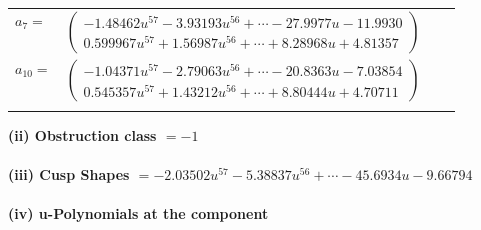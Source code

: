 \documentclass[1p]{elsarticle_modified}
\theoremstyle{definition}
\begin{document}
\begin{tabular}{m{7pt} m{180pt} m{7pt} m{180pt} }
\flushright $a_{7}=$&$\begin{pmatrix}-1.48462 u^{57}-3.93193 u^{56}+\cdots-27.9977 u-11.9930\\0.599967 u^{57}+1.56987 u^{56}+\cdots+8.28968 u+4.81357\end{pmatrix}$ \\
\flushright $a_{10}=$&$\begin{pmatrix}-1.04371 u^{57}-2.79063 u^{56}+\cdots-20.8363 u-7.03854\\0.545357 u^{57}+1.43212 u^{56}+\cdots+8.80444 u+4.70711\end{pmatrix}$\\&\end{tabular}
\flushleft \textbf{(ii) Obstruction class $= -1$}\\~\\
\flushleft \textbf{(iii) Cusp Shapes $= -2.03502 u^{57}-5.38837 u^{56}+\cdots-45.6934 u-9.66794$}\\~\\
\newpage\renewcommand{\arraystretch}{1}
\flushleft \textbf{(iv) u-Polynomials at the component}\newline \\
\end{document}
